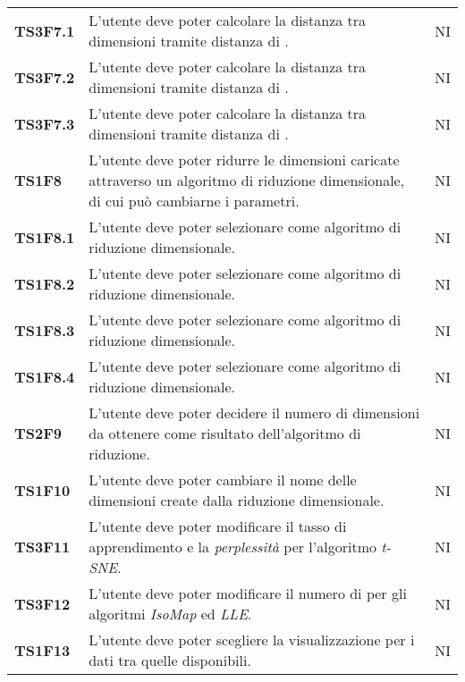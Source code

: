 {\begin{longtable}{ C{2cm} | C{12cm}| C{1.5cm} }
\textbf{TS3F7.1} & 
L'utente deve poter calcolare la distanza tra dimensioni tramite distanza di \textit{}. & 
NI\\

\textbf{TS3F7.2} & 
L'utente deve poter calcolare la distanza tra dimensioni tramite distanza di \textit{}. & 
NI\\

\textbf{TS3F7.3} & 
L'utente deve poter calcolare la distanza tra dimensioni tramite distanza di \textit{}. & 
NI\\

\textbf{TS1F8} & 
L'utente deve poter ridurre le dimensioni caricate attraverso un algoritmo di riduzione dimensionale, di cui può cambiarne i parametri. & 
NI\\

\textbf{TS1F8.1} & 
L'utente deve poter selezionare \textit{} come algoritmo di riduzione dimensionale. & 
NI\\

\textbf{TS1F8.2} & 
L'utente deve poter selezionare \textit{} come algoritmo di riduzione dimensionale. & 
NI\\

\textbf{TS1F8.3} & 
L'utente deve poter selezionare \textit{} come algoritmo di riduzione dimensionale. & 
NI\\

\textbf{TS1F8.4} & 
L'utente deve poter selezionare \textit{} come algoritmo di riduzione dimensionale. & 
NI\\

\textbf{TS2F9} & 
L'utente deve poter decidere il numero di dimensioni da ottenere come risultato dell'algoritmo di riduzione. & 
NI\\

\textbf{TS1F10} & 
L'utente deve poter cambiare il nome delle dimensioni create dalla riduzione dimensionale. & 
NI\\

\textbf{TS3F11} & 
L'utente deve poter modificare il tasso di apprendimento e la \textit{perplessità} per l'algoritmo \textit{t-SNE}. & 
NI\\

\textbf{TS3F12} & 
L'utente deve poter modificare il numero di \textit{} per gli algoritmi \textit{IsoMap} ed \textit{LLE}. & 
NI\\

\textbf{TS1F13} & 
L'utente deve poter scegliere la visualizzazione per i dati tra quelle disponibili. & 
NI\\


\end{longtable}}
